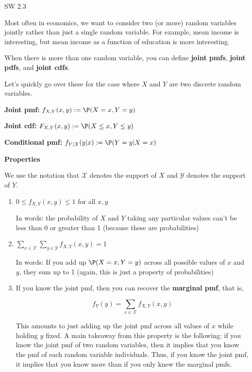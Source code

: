\documentclass[
  letterpaper,
  DIV=11,
  numbers=noendperiod]{scrreprt}
\begin{document}
SW 2.3

Most often in economics, we want to consider two (or more) random
variables jointly rather than just a single random variable. For
example, mean income is interesting, but mean income as a function of
education is more interesting.

When there is more than one random variable, you can define
\textbf{joint pmfs}, \textbf{joint pdfs}, and \textbf{joint cdfs}.

Let's quickly go over these for the case where \(X\) and \(Y\) are two
discrete random variables.

\textbf{Joint pmf:} \(f_{X,Y}(x,y) := \P(X=x, Y=y)\)

\textbf{Joint cdf:} \(F_{X,Y}(x,y) := \P(X \leq x, Y \leq y)\)

\textbf{Conditional pmf:} \(f_{Y|X}(y|x) := \P(Y=y | X=x)\)

\textbf{Properties}

We use the notation that \(\mathcal{X}\) denotes the support of \(X\)
and \(\mathcal{Y}\) denotes the support of \(Y\).

\begin{enumerate}
\def\labelenumi{\arabic{enumi}.}
\item
  \(0 \leq f_{X,Y}(x,y) \leq 1\) for all \(x,y\)

  In words: the probability of \(X\) and \(Y\) taking any particular
  values can't be less than 0 or greater than 1 (because these are
  probabilities)
\item
  \(\displaystyle \sum_{x \in \mathcal{X}} \sum_{y \in \mathcal{Y}} f_{X,Y}(x,y) = 1\)

  In words: If you add up \(\P(X=x, Y=y)\) across all possible values of
  \(x\) and \(y\), they sum up to 1 (again, this is just a property of
  probabilities)
\item
  If you know the joint pmf, then you can recover the \textbf{marginal
  pmf}, that is,

  \[
   f_Y(y) = \sum_{x \in \mathcal{X}} f_{X,Y}(x,y)
   \]

  This amounts to just adding up the joint pmf across all values of
  \(x\) while holding \(y\) fixed. A main takeaway from this property is
  the following: if you know the joint pmf of two random variables, then
  it implies that you know the pmf of each random variable individuals.
  Thus, if you know the joint pmf, it implies that you know more than if
  you only knew the marginal pmfs.
\end{enumerate}
\end{document}
